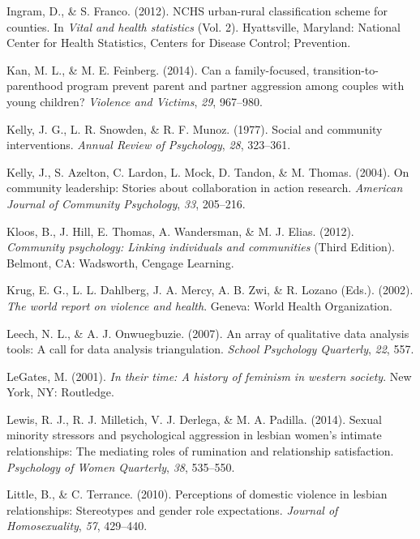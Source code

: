 \documentclass[11pt,]{tufte-book}
\begin{document}
\hypertarget{ref-ingram2012nchs}{}
Ingram, D., \& S. Franco. (2012). NCHS urban-rural classification scheme
for counties. In \emph{Vital and health statistics} (Vol. 2).
Hyattsville, Maryland: National Center for Health Statistics, Centers
for Disease Control; Prevention.

\hypertarget{ref-kan2014can}{}
Kan, M. L., \& M. E. Feinberg. (2014). Can a family-focused,
transition-to-parenthood program prevent parent and partner aggression
among couples with young children? \emph{Violence and Victims},
\emph{29}, 967--980.

\hypertarget{ref-kelly1977social}{}
Kelly, J. G., L. R. Snowden, \& R. F. Munoz. (1977). Social and
community interventions. \emph{Annual Review of Psychology}, \emph{28},
323--361.

\hypertarget{ref-kelly2004community}{}
Kelly, J., S. Azelton, C. Lardon, L. Mock, D. Tandon, \& M. Thomas.
(2004). On community leadership: Stories about collaboration in action
research. \emph{American Journal of Community Psychology}, \emph{33},
205--216.

\hypertarget{ref-kloos2012community}{}
Kloos, B., J. Hill, E. Thomas, A. Wandersman, \& M. J. Elias. (2012).
\emph{Community psychology: Linking individuals and communities} (Third
Edition). Belmont, CA: Wadsworth, Cengage Learning.

\hypertarget{ref-krug2002world}{}
Krug, E. G., L. L. Dahlberg, J. A. Mercy, A. B. Zwi, \& R. Lozano
(Eds.). (2002). \emph{The world report on violence and health}. Geneva:
World Health Organization.

\hypertarget{ref-leech2007array}{}
Leech, N. L., \& A. J. Onwuegbuzie. (2007). An array of qualitative data
analysis tools: A call for data analysis triangulation. \emph{School
Psychology Quarterly}, \emph{22}, 557.

\hypertarget{ref-legates2001their}{}
LeGates, M. (2001). \emph{In their time: A history of feminism in
western society}. New York, NY: Routledge.

\hypertarget{ref-lewis2014sexual}{}
Lewis, R. J., R. J. Milletich, V. J. Derlega, \& M. A. Padilla. (2014).
Sexual minority stressors and psychological aggression in lesbian
women's intimate relationships: The mediating roles of rumination and
relationship satisfaction. \emph{Psychology of Women Quarterly},
\emph{38}, 535--550.

\hypertarget{ref-little2010perceptions}{}
Little, B., \& C. Terrance. (2010). Perceptions of domestic violence in
lesbian relationships: Stereotypes and gender role expectations.
\emph{Journal of Homosexuality}, \emph{57}, 429--440.
\end{document}
